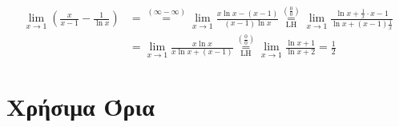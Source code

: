 \begin{example}
  \begin{align*}
    \lim_{x \to 1} (\frac{x}{x-1} - \frac{1}{\ln{x}}) 
    &= \overset{(\infty- \infty)}{=}
    \lim_{x \to 1} \frac{x \ln{x} - (x-1)}{(x-1) \ln{x}}
    \overset{\left(\frac{0}{0}\right)}{\underset{\mathrm{LH}}{=}} \lim_{x \to 1}
    \frac{\ln{x} + \frac{1}{x} \cdot x -1}{\ln{x} + (x-1) \frac{1}{x}} \\
    &= \lim_{x \to 1} \frac{x \ln{x}}{x \ln{x} +(x-1)}
    \overset{\left(\frac{0}{0}\right)}{\underset{\mathrm{LH}}{=}} \lim_{x \to 1}
    \frac{\ln{x} +1}{\ln{x} +2} = \frac{1}{2}
  \end{align*}
  \end{example}
	


\section*{Χρήσιμα Όρια}


